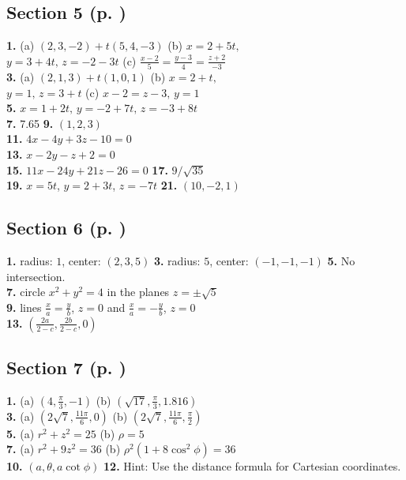 \begin{multicols}{2}
\subsection*{Section 5 (p. \pageref{ssec1dot5})}
\textbf{1.} (a) $(2,3,-2) + t(5,4,-3)$ \quad (b) $x = 2 + 5t,$\\$y = 3 + 4t, \, z = -2 - 3t$ \quad (c) $\frac{x - 2}{5} =
\frac{y - 3}{4} = \frac{z + 2}{-3}$\\\textbf{3.} (a) $(2,1,3) + t(1,0,1)$ \quad (b) $x = 2 + t,$\\$y = 1, \, z = 3 + t$
\quad (c) $x - 2 = z - 3, \, y = 1$\\\textbf{5.} $x = 1 + 2t, \, y = -2 + 7t, \, z = -3 + 8t$\\\textbf{7.} 7.65 \quad
\textbf{9.} $(1,2,3)$\\\textbf{11.} $4x - 4y + 3z - 10 = 0$\\\textbf{13.} $x - 2y - z + 2 = 0$\\\textbf{15.}
$11x - 24y + 21z - 26 = 0$ \quad \textbf{17.} $9/\sqrt{35}$\\\textbf{19.} $x = 5t$, $y = 2 + 3t$, $z = -7t$
\quad \textbf{21.} $(10,-2,1)$
\subsection*{Section 6 (p. \pageref{ssec1dot6})}
\textbf{1.} radius: $1$, center: $(2,3,5)$ \quad \textbf{3.} radius: $5$, center: $(-1,-1,-1)$ \quad \textbf{5.} No
intersection.\\\textbf{7.} circle $x^2 + y^2 = 4$ in the planes $z = \pm \sqrt{5}$\\\textbf{9.} lines
$\frac{x}{a} = \frac{y}{b}$, $z = 0$ and $\frac{x}{a} = -\frac{y}{b}$, $z = 0$\\\textbf{13.}
$\left( \frac{2a}{2 - c}, \frac{2b}{2 - c}, 0 \right)$
\subsection*{Section 7 (p. \pageref{ssec1dot7})}
\textbf{1.} (a) $(4,\frac{\pi}{3},-1)$ \quad (b) $(\sqrt{17},\frac{\pi}{3},1.816)$\\\textbf{3.} (a)
$(2\sqrt{7},\frac{11\pi}{6},0)$ \quad (b) $(2\sqrt{7},\frac{11\pi}{6},\frac{\pi}{2})$\\\textbf{5.} (a) $r^2 + z^2 = 25$
\quad (b) $\rho = 5$\\\textbf{7.} (a) $r^2 + 9z^2 = 36$ \quad (b) $\rho^2 ( 1 + 8 \cos^2 \phi ) = 36$\\
\textbf{10.} $(a,\theta,a \cot \phi )$ \quad \textbf{12.} Hint: Use the distance formula for Cartesian coordinates.
\end{multicols}